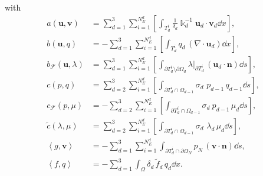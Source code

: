 with
\begin{align}
a\left(  \mathbf{u},\mathbf{v}\right)   &  =\sum_{d=1}^{3}\sum_{i=1}%
^{N_{E}^{d}}\left[  \int_{T_{d}^{i}}\frac{1}{\delta_{d}}\Bbbk_{d}%
^{-1}\mathbf{u}_{d}\cdot\mathbf{v}_{d}\dd x\right]  ,\label{eq:weak_term_a}\\
b\left(  \mathbf{u},q\right)   &  =-\sum_{d=1}^{3}\sum_{i=1}^{N_{E}^{d}%
}\left[  \int_{T_{d}^{i}}q_{d}\,\left(  \nabla\cdot\mathbf{u}_{d}\right)
\dd x\right]  ,\\
b_{\mathcal{F}}\left(  \mathbf{u},\lambda\right)   &  =\sum_{d=1}^{3}%
\sum_{i=1}^{N_{E}^{d}}\left[  \int_{\partial T_{d}^{i}\setminus\partial
\Omega_{d}}\lambda|_{\partial T_{d}^{i}}\,\left(  \mathbf{u}_{d}%
\cdot\mathbf{n}\right)  \dd s\right]  ,\\
c\left(  p,q\right)   &  =\sum_{d=2}^{3}\sum_{i=1}^{N_{E}^{d}%
}\left[  \int_{\partial T_{d}^{i}\cap\Omega_{d-1}}\sigma_{d}\,\,p_{d-1}%
\,q_{d-1}\dd s\right]  ,\label{eq:weak_term_cbar}\\
c_{\mathcal{F}}\left(  p,\mu\right)   &  =-\sum_{d=2}^{3}\sum_{i=1}^{N_{E}%
^{d}}\left[  \int_{\partial T_{d}^{i}\cap\Omega_{d-1}}\sigma_{d}\ p_{d-1}%
\,\mu_{d}\dd s\right]  ,\label{eq:weak_term_cF}\\
\widetilde{c}\left(  \lambda,\mu\right)   &  =\sum_{d=2}^{3}\sum_{i=1}%
^{N_{E}^{d}}\left[  \int_{\partial T_{d}^{i}\cap\Omega_{d-1}}\sigma
_{d}\,\,\lambda_{d}\,\mu_{d}\dd s\right]  ,\label{eq:weak_term_ctilde}\\
\left\langle g,\mathbf{v}\right\rangle  &  =-\sum_{d=1}^{3}\sum_{i=1}%
^{N_{E}^{d}}\int_{\partial T_{d}^{i}\cap\partial\Omega_{N}}p_{N}\,\left(
\mathbf{v}\cdot\mathbf{n}\right)  \dd s,\\
\left\langle f,q\right\rangle  &  =-\sum_{d=1}^{3}\int_{\Omega
}\delta_{d}\,\tilde{f}_{d}\,q_{d}\dd x. \label{eq:weak_term_f}%
\end{align}


